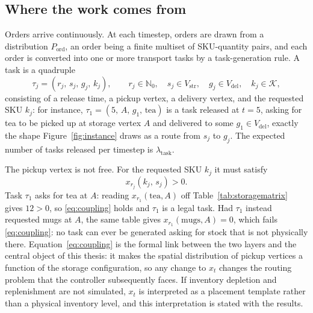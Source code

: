 \documentclass[../main.tex]{subfiles}
\begin{document}
\subsection{Where the work comes from}
\label{sec:pf:tasks}

Orders arrive continuously. At each timestep, orders are drawn from a
distribution $P_{\mathrm{ord}}$, an order being a finite multiset of
SKU-quantity pairs, and each order is converted into one or more transport tasks
by a task-generation rule. A task is a quadruple %
\begin{equation}
  \tau_j = (r_j,\, s_j,\, g_j,\, k_j), \qquad
  r_j \in \mathbb{N}_0,\quad s_j \in V_{\mathrm{str}},\quad
  g_j \in V_{\mathrm{del}}, \quad k_j \in \mathcal{K},
  \label{eq:task}
\end{equation}
consisting of a release time, a pickup vertex, a delivery vertex, and the
requested SKU $k_j$: for instance, $\tau_1 = (5,\, A,\, g_1,\, \mathrm{tea})$
is a task released at $t=5$, asking for tea to be picked up at storage
vertex $A$ and delivered to some $g_1 \in V_{\mathrm{del}}$, exactly the
shape Figure~\ref{fig:instance} draws as a route from $s_j$ to $g_j$. The
expected number of tasks released per timestep is $\lambda_{\mathrm{task}}$.

The pickup vertex is not free. For the requested SKU $k_j$ it must satisfy
\begin{equation}
  x_{r_j}(k_j,\, s_j) > 0 .
  \label{eq:coupling}
\end{equation}
Task $\tau_1$ asks for tea at $A$: reading $x_{r_1}(\mathrm{tea},A)$ off
Table~\ref{tab:storagematrix} gives $12 > 0$, so \eqref{eq:coupling} holds
and $\tau_1$ is a legal task. Had $\tau_1$ instead requested mugs at $A$,
the same table gives $x_{r_1}(\mathrm{mugs},A) = 0$, which fails
\eqref{eq:coupling}: no task can ever be generated asking for stock that is
not physically there. Equation~\eqref{eq:coupling} is the formal link between the two layers and the
central object of this thesis: it makes the spatial distribution of pickup
vertices a function of the storage configuration, so any change to $x_t$ changes
the routing problem that the controller subsequently faces. If inventory
depletion and replenishment are not simulated, $x_t$ is interpreted as a
placement template rather than a physical inventory level, and this
interpretation is stated with the results.
\end{document}
